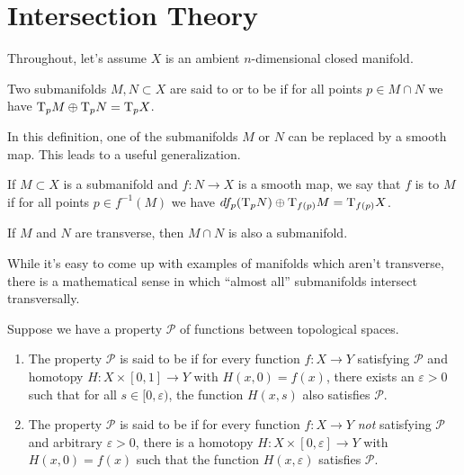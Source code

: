 

\section{Intersection Theory}

Throughout, let's assume $X$ is an ambient $n$-dimensional closed manifold.

\begin{definition}
	Two submanifolds $M,N\subset X$ are said to  or to be  if for all points $p\in M\cap N$ we have $\mathrm{T}_p M\oplus \mathrm{T}_p N = \mathrm{T}_p X$.
\end{definition}

In this definition, one of the submanifolds $M$ or $N$ can be replaced by a smooth map. This leads to a useful generalization.

\begin{definition}
	If $M\subset X$ is a submanifold and $f : N \to X$ is a smooth map, we say that $f$ is  to $M$ if for all points $p\in f^{-1}(M)$ we have $df_p(\mathrm{T}_p N)\oplus \mathrm{T}_{f(p)}M = \mathrm{T}_{f(p)}X$.
\end{definition}

\begin{theorem}
\end{theorem}

\begin{corollary}
	If $M$ and $N$ are transverse, then $M\cap N$ is also a submanifold.
\end{corollary}

While it's easy to come up with examples of manifolds which aren't transverse, there is a mathematical sense in which ``almost all'' submanifolds intersect transversally.

\begin{definition}
	Suppose we have a property $\mathcal{P}$ of functions between topological spaces.
	\begin{enumerate}
		\item The property $\mathcal{P}$ is said to be  if for every function $f : X \to Y$ satisfying $\mathcal{P}$ and homotopy $H : X\times[0,1]\to Y$ with $H(x,0) = f(x)$, there exists an $\varepsilon>0$ such that for all $s\in [0,\varepsilon)$, the function $H(x,s)$ also satisfies $\mathcal{P}$.
		\item The property $\mathcal{P}$ is said to be  if for every function $f : X \to Y$ \emph{not} satisfying $\mathcal{P}$ and arbitrary $\varepsilon>0$, there is a homotopy $H : X\times [0,\varepsilon] \to Y$ with $H(x,0)=f(x)$ such that the function $H(x,\varepsilon)$ satisfies $\mathcal{P}$.
	\end{enumerate}
\end{definition}

